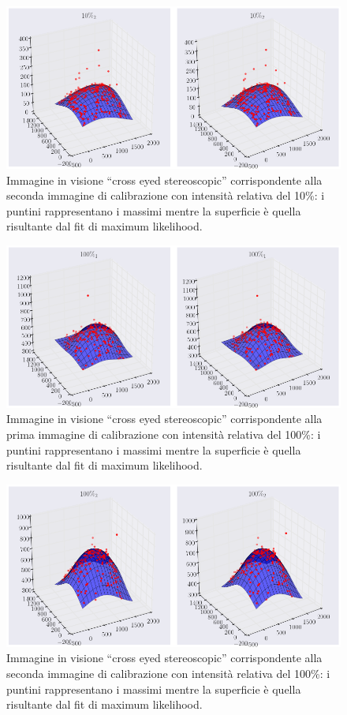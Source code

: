 \begin{figure}
 \centering
 \includegraphics[scale=.45]{img/CAP4gauss2.png}
 \caption{\small{Immagine in visione ``cross eyed stereoscopic'' corrispondente alla seconda immagine di calibrazione con intensità relativa del 10\%: i puntini rappresentano i massimi mentre la superficie è quella risultante dal fit di maximum likelihood.}}
 \label{fig:gauss2}
\end{figure}

\begin{figure}
 \centering
 \includegraphics[scale=.45]{img/CAP4gauss3.png}
 \caption{\small{Immagine in visione ``cross eyed stereoscopic'' corrispondente alla prima immagine di calibrazione con intensità relativa del 100\%: i puntini rappresentano i massimi mentre la superficie è quella risultante dal fit di maximum likelihood.}}
 \label{fig:gauss3}
\end{figure}

\begin{figure}
 \centering
 \includegraphics[scale=.45]{img/CAP4gauss4.png}
 \caption{\small{Immagine in visione ``cross eyed stereoscopic'' corrispondente alla seconda immagine di calibrazione con intensità relativa del 100\%: i puntini rappresentano i massimi mentre la superficie è quella risultante dal fit di maximum likelihood.}}
 \label{fig:gauss4}
\end{figure}

